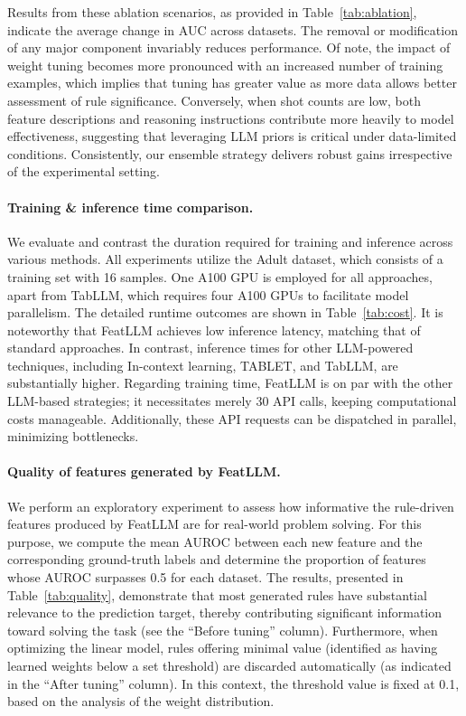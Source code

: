 Results from these ablation scenarios, as provided in Table~\ref{tab:ablation}, indicate the average change in AUC across datasets. The removal or modification of any major component invariably reduces performance. Of note, the impact of weight tuning becomes more pronounced with an increased number of training examples, which implies that tuning has greater value as more data allows better assessment of rule significance. Conversely, when shot counts are low, both feature descriptions and reasoning instructions contribute more heavily to model effectiveness, suggesting that leveraging LLM priors is critical under data-limited conditions. Consistently, our ensemble strategy delivers robust gains irrespective of the experimental setting.

\vspace*{-0.12in}
\paragraph{Training \& inference time comparison.} We evaluate and contrast the duration required for training and inference across various methods. All experiments utilize the Adult dataset, which consists of a training set with 16 samples. One A100 GPU is employed for all approaches, apart from TabLLM, which requires four A100 GPUs to facilitate model parallelism. The detailed runtime outcomes are shown in Table~\ref{tab:cost}. It is noteworthy that \textsf{FeatLLM} achieves low inference latency, matching that of standard approaches. In contrast, inference times for other LLM-powered techniques, including In-context learning, TABLET, and TabLLM, are substantially higher. Regarding training time, \textsf{FeatLLM} is on par with the other LLM-based strategies; it necessitates merely 30 API calls, keeping computational costs manageable. Additionally, these API requests can be dispatched in parallel, minimizing bottlenecks.

\vspace*{-0.12in}
\paragraph{Quality of features generated by \textsf{FeatLLM}.}
We perform an exploratory experiment to assess how informative the rule-driven features produced by \textsf{FeatLLM} are for real-world problem solving. For this purpose, we compute the mean AUROC between each new feature and the corresponding ground-truth labels and determine the proportion of features whose AUROC surpasses 0.5 for each dataset. The results, presented in Table~\ref{tab:quality}, demonstrate that most generated rules have substantial relevance to the prediction target, thereby contributing significant information toward solving the task (see the ``Before tuning'' column). Furthermore, when optimizing the linear model, rules offering minimal value (identified as having learned weights below a set threshold) are discarded automatically (as indicated in the ``After tuning'' column). In this context, the threshold value is fixed at 0.1, based on the analysis of the weight distribution.

